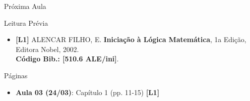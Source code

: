 \documentclass[xcolor=dvipsnames,table]{beamer}
\begin{document}
    \begin{frame}{Próxima Aula}
    \begin{block}{Leitura Prévia}
        \begin{itemize}
            \item {\bf \color{blue} [L1]} ALENCAR FILHO, E. {\bf Iniciação à Lógica Matemática}, 1a Edição, Editora Nobel, 2002. \\{\color{blue} \bf Código Bib.: [510.6 ALE/ini]}.
        \end{itemize}
    \end{block}
    \begin{block}{Páginas}
        \begin{itemize}
        \item {\bf Aula 03 (24/03)}: Capítulo 1 (pp. 11-15) {\bf \color{blue} [L1]} 
        \end{itemize}
    \end{block}
\end{frame}
	
	\begin{frame}
		\titlepage
	\end{frame}
	
\end{document}
